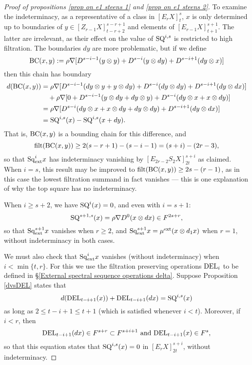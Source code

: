 \documentclass[11pt]{amsart} \renewcommand{\baselinestretch}{1.2}
\theoremstyle{plain}
\numberwithin{equation}{section} %
\theoremstyle{plain}
\numberwithin{equation}{chapter} %
\newcommand{\Nabla}{\nabla}
\newcommand{\Sq}{\mathrm{Sq}}
\newcommand{\E}[5]{[E^{#1}_{#2}#3]^{#4}_{#5}}
\newcommand{\Edownup}[5]{[E_{#1}^{#2}#3]^{#4}_{#5}}
\newcommand{\EZdownup}[5]{[Z^{#2}_{#1}#3]^{#4}_{#5}}
\newcommand{\filt}{\mathrm{filt}}
\begin{document}
\begin{second quadrant homotopy sseq operations}
\begin{proof}[Proof of propositions \ref{prop on e1 steens 1} and \ref{prop on e1 steens 2}]
To examine the indeterminacy, as a representative of a class in $\Edownup{r}{}{X}{s}{t}$,  $x$ is only determined up to boundaries of $y\in \EZdownup{r-1}{}{X}{s-r+1}{t-r+2}  $ and elements of $\Edownup{r-1}{}{X}{s+1}{t+1}$. The latter are irrelevant, as their effect on the value of $\textup{SQ}^{i,s}$ is restricted to high filtration. The boundaries $dy$ are more problematic, but if we define 
\[\textup{BC}(x,y):=\rho\Nabla [D^{s-i-1}(y\otimes y)+D^{s-i}(y\otimes dy)+D^{s-i+1}(dy\otimes x)]\]
then this chain has boundary
\begin{alignat*}{2}
d(\textup{BC}(x,y))
&=
\rho\Nabla [D^{s-i-1}(dy\otimes y+y\otimes dy)+D^{s-i}(dy\otimes dy)+D^{s-i+1}(dy\otimes dx)]%
\\
&\ \ \ +
\rho\Nabla [0+D^{s-i-1}(y\otimes dy+dy\otimes y)+D^{s-i}(dy\otimes x+x\otimes dy)]%
\\
&=
\rho\Nabla [D^{s-i}(dy\otimes x+x\otimes dy+dy\otimes dy)
+D^{s-i+1}(dy\otimes dx)]\\
&=\textup{SQ}^{i,s}(x)-\textup{SQ}^{i,s}(x+dy).%
\end{alignat*} 
That is, $\textup{BC}(x,y)$ is a bounding chain for this difference, and
\[\filt(\textup{BC}(x,y))\geq 2(s-r+1)-(s-i-1)=(s+i)-(2r-3),\]
so that $\Sq^i_\textup{ext}x$ has indeterminacy vanishing by $\Edownup{2r-2}{}{S_2X}{s+i}{2t}$ as claimed. When $i=s$, this result may be improved to $\filt(\textup{BC}(x,y))\geq 2s-(r-1)$,  as in this case the lowest filtration summand in fact vanishes --- this is one explanation of why the top square has no indeterminacy.

When $i\geq s+2$, we have $\textup{SQ}^{i}(x)=0$, and even with $i=s+1$:
\[\textup{SQ}^{s+1,s}(x)=\rho\nabla D^{0}(x\otimes dx)\in F^{2s+r},\]
so that $\Sq^{s+1}_\textup{ext}x$ vanishes when $r\geq2$,  and $\Sq^{s+1}_\textup{ext}x=\mu^\textup{ext}(x\otimes d_1x)$  when $r=1$, without indeterminacy in both cases. 

We must also check that $\Sq^i_\textup{ext}x$ vanishes (without indeterminacy) when $i<\min\{t,r\}$. For this we use the filtration preserving operations $\textup{DEL}_i$ to be defined in \S\ref{External spectral sequence operations delta}. Suppose   Proposition \ref{dvsDEL} states that
\[d(\textup{DEL}_{t-i+1}(x))+ \textup{DEL}_{t-i+1}(dx)=
\textup{SQ}^{i,s}(x)\]
as long as $2\leq t-i+1\leq t+1$ (which is satisfied whenever $i<t$). Moreover, if $i<r$, then 
\[ \textup{DEL}_{t-i+1}(dx)\in F^{s+r}\subset F^{s+i+1}\textup{ and }\textup{DEL}_{t-i+1}(x)\in F^{s},\]
so that this equation states that $\textup{SQ}^{i,s}(x)=0$ in $\E{}{r}{X}{s+i}{2t}$, without indeterminacy.



\end{proof}
\end{second quadrant homotopy sseq operations}
\end{document}
